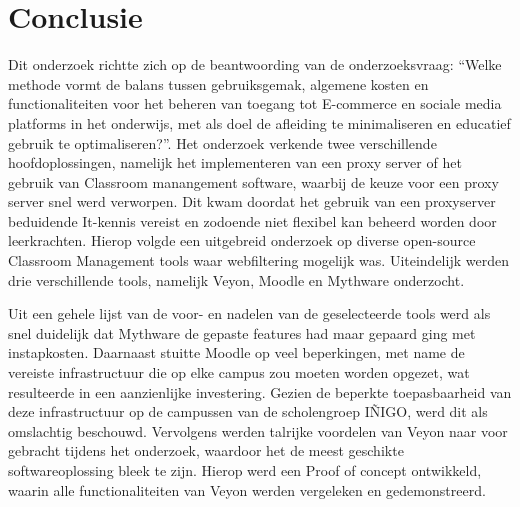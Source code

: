 
\chapter{Conclusie}%
\label{ch:conclusie}


Dit onderzoek richtte zich op de beantwoording van de onderzoeksvraag: ``Welke methode vormt de balans tussen gebruiksgemak, algemene kosten en functionaliteiten voor het beheren van toegang tot E-commerce en sociale media platforms in het onderwijs, met als doel de afleiding te minimaliseren en educatief gebruik te optimaliseren?''. Het onderzoek verkende twee verschillende hoofdoplossingen, namelijk het implementeren van een proxy server of het gebruik van Classroom manangement software, waarbij de keuze voor een proxy server snel werd verworpen. Dit kwam doordat het gebruik van een proxyserver beduidende It-kennis vereist en zodoende niet flexibel kan beheerd worden door leerkrachten. Hierop volgde een uitgebreid onderzoek op diverse open-source Classroom Management tools waar webfiltering mogelijk was. Uiteindelijk werden drie verschillende tools, namelijk Veyon, Moodle en Mythware onderzocht.\newline

Uit een gehele lijst van de voor- en nadelen van de geselecteerde tools werd als snel duidelijk dat Mythware de gepaste features had maar gepaard ging met instapkosten. Daarnaast stuitte Moodle op veel beperkingen, met name de vereiste infrastructuur die op elke campus zou moeten worden opgezet, wat resulteerde in een aanzienlijke investering. Gezien de beperkte toepasbaarheid van deze infrastructuur op de campussen van de scholengroep IÑIGO, werd dit als omslachtig beschouwd. Vervolgens werden talrijke voordelen van Veyon naar voor gebracht tijdens het onderzoek, waardoor het de meest geschikte softwareoplossing bleek te zijn. Hierop werd een Proof of concept ontwikkeld, waarin alle functionaliteiten van Veyon werden vergeleken en gedemonstreerd.\newline 

